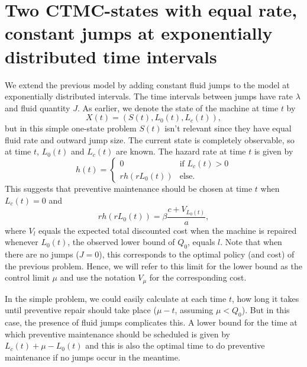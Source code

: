 \section{Two CTMC-states with equal rate, constant jumps at exponentially distributed time intervals}
We extend the previous model by adding constant fluid jumps to the model at exponentially distributed intervals.
The time intervals between jumps have rate $\lambda$ and fluid quantity $J$.
As earlier, we denote the state of the machine at time $t$ by
$$
X(t)=(S(t),L_0(t),L_c(t)),
$$
but in this simple one-state problem $S(t)$ isn't relevant since they have equal fluid rate and outward jump size.
The current state is completely observable, so at time $t$, $L_0(t)$ and $L_c(t)$ are known.
The hazard rate at time $t$ is given by
\begin{equation}
h(t)=\begin{cases}
0&\text{if }L_c(t)>0\\
rh(rL_0(t))&\text{else.}
\end{cases}
\end{equation} 
This suggests that preventive maintenance should be chosen at time $t$ when $L_c(t)=0$ and
\begin{equation}
rh(rL_0(t))=\beta\frac{c+V_{L_0(t)}}{a},
\end{equation}
where $V_{l}$ equals the expected total discounted cost when the machine is repaired whenever $L_0(t)$, the observed lower bound of $Q_0$, equals $l$.
Note that when there are no jumps ($J=0$), this corresponds to the optimal policy (and cost) of the previous problem.
Hence, we will refer to this limit for the lower bound as the control limit $\mu$ and use the notation $V_\mu$ for the corresponding cost.

In the simple problem, we could easily calculate at each time $t$, how long it takes until preventive repair should take place ($\mu-t$, assuming $\mu<Q_0$).
But in this case, the presence of fluid jumps complicates this.
A lower bound for the time at which preventive maintenance should be scheduled is given by $L_c(t)+\mu-L_0(t)$ and this is also the optimal time to do preventive maintenance if no jumps occur in the meantime.

